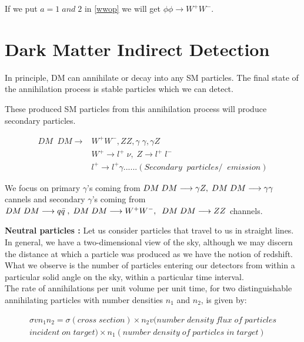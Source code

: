 \documentclass[12pt]{report}
\begin{document}
If we put $a=1\; and\; 2$ in \ref{wwop} we will get $\phi\phi \longrightarrow W^+ W^-$.
 
 
\section{Dark Matter Indirect Detection}

In principle, DM can annihilate or decay into any SM particles. The final state of the annihilation process is stable particles which we can detect.

These produced SM particles from this annihilation process will produce secondary particles.

\begin{align*}
DM\;\; DM \longrightarrow& W^+ W^-, ZZ, \gamma\; \gamma, \gamma Z\\
&W^+ \longrightarrow l^+\; \nu,\; Z \longrightarrow l^+ \; l^-\\
&l^+ \longrightarrow l^+ \gamma...... (Secondary\;\; particles/ \;\; emission)
\end{align*}


We focus on primary $\gamma$'s coming from  $DM\; DM \longrightarrow \gamma Z , \; \; \\ DM\; DM \longrightarrow \gamma  \gamma $ cannels and secondary $\gamma$'s coming from $DM\;DM \longrightarrow q \bar{q}\; , \; \; \\ DM\; DM \longrightarrow W^+W^-, \; \;
DM\; DM \longrightarrow ZZ$ channels.

\textbf{Neutral particles :} Let us consider particles that travel to us in straight lines. In general, we have a two-dimensional view of the sky, although we may discern the distance at which a particle was produced as we have the notion of redshift.
What we observe is the number of particles entering our detectors from within a particular solid angle on the sky, within a particular time interval.\\

The rate of annihilations per unit volume per unit time,  for two distinguishable annihilating particles with number densities $n_1$ and $n_2$, is given by:





\begin{multline*}
\sigma v n_1 n_2= \sigma(cross\; section) \times n_2 v(number\; density\; flux\; of\; particles\\ incident\; on\; target) \times n_1(number\; density\; of\; particles\; in\; target)
\end{multline*} 
\end{document}
